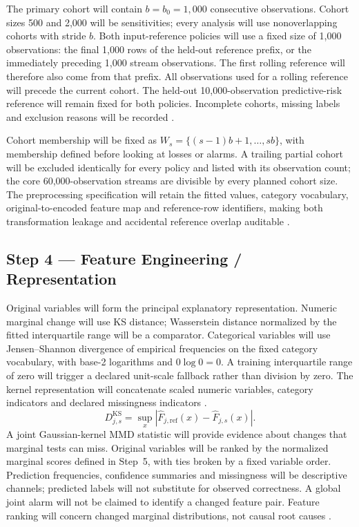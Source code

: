 The primary cohort will contain $b=b_0=1{,}000$ consecutive observations. Cohort sizes 500 and 2,000 will be sensitivities; every analysis will use nonoverlapping cohorts with stride $b$. Both input-reference policies will use a fixed size of 1,000 observations: the final 1,000 rows of the held-out reference prefix, or the immediately preceding 1,000 stream observations. The first rolling reference will therefore also come from that prefix. All observations used for a rolling reference will precede the current cohort. The held-out 10,000-observation predictive-risk reference will remain fixed for both policies. Incomplete cohorts, missing labels and exclusion reasons will be recorded \cite{greco,lukats,souza}.

Cohort membership will be fixed as $W_s=\{(s-1)b+1,\ldots,sb\}$, with membership defined before looking at losses or alarms. A trailing partial cohort will be excluded identically for every policy and listed with its observation count; the core 60,000-observation streams are divisible by every planned cohort size. The preprocessing specification will retain the fitted values, category vocabulary, original-to-encoded feature map and reference-row identifiers, making both transformation leakage and accidental reference overlap auditable \cite{souza}.

\subsection*{Step 4 --- Feature Engineering / Representation}
Original variables will form the principal explanatory representation. Numeric marginal change will use KS distance; Wasserstein distance normalized by the fitted interquartile range will be a comparator. Categorical variables will use Jensen--Shannon divergence of empirical frequencies on the fixed category vocabulary, with base-2 logarithms and $0\log0=0$. A training interquartile range of zero will trigger a declared unit-scale fallback rather than division by zero. The kernel representation will concatenate scaled numeric variables, category indicators and declared missingness indicators \cite{greco,szucs}.
\begin{equation}
D_{j,s}^{\mathrm{KS}}=\sup_x|\widehat F_{j,\mathrm{ref}}(x)-\widehat F_{j,s}(x)|.
\end{equation}
A joint Gaussian-kernel MMD statistic will provide evidence about changes that marginal tests can miss. Original variables will be ranked by the normalized marginal scores defined in Step~5, with ties broken by a fixed variable order. Prediction frequencies, confidence summaries and missingness will be descriptive channels; predicted labels will not substitute for observed correctness. A global joint alarm will not be claimed to identify a changed feature pair. Feature ranking will concern changed marginal distributions, not causal root causes \cite{greco,szucs,driftvis,gretton}.

